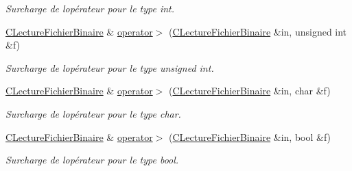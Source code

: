 \begin{DoxyCompactItemize}
\begin{DoxyCompactList}\small\item\em Surcharge de l\textquotesingle{}opérateur pour le type {\itshape int}. \end{DoxyCompactList}\item 
\hypertarget{class_c_lecture_fichier_binaire_a10555985d21e9277fd610554eb804ad4}{}\hyperlink{class_c_lecture_fichier_binaire}{C\+Lecture\+Fichier\+Binaire} \& \hyperlink{class_c_lecture_fichier_binaire_a10555985d21e9277fd610554eb804ad4}{operator$>$} (\hyperlink{class_c_lecture_fichier_binaire}{C\+Lecture\+Fichier\+Binaire} \&in, unsigned int \&f)\label{class_c_lecture_fichier_binaire_a10555985d21e9277fd610554eb804ad4}

\begin{DoxyCompactList}\small\item\em Surcharge de l\textquotesingle{}opérateur pour le type {\itshape unsigned} {\itshape int}. \end{DoxyCompactList}\item 
\hypertarget{class_c_lecture_fichier_binaire_a4a3ac4fa35e1f11664f6612d554d72bd}{}\hyperlink{class_c_lecture_fichier_binaire}{C\+Lecture\+Fichier\+Binaire} \& \hyperlink{class_c_lecture_fichier_binaire_a4a3ac4fa35e1f11664f6612d554d72bd}{operator$>$} (\hyperlink{class_c_lecture_fichier_binaire}{C\+Lecture\+Fichier\+Binaire} \&in, char \&f)\label{class_c_lecture_fichier_binaire_a4a3ac4fa35e1f11664f6612d554d72bd}

\begin{DoxyCompactList}\small\item\em Surcharge de l\textquotesingle{}opérateur pour le type {\itshape char}. \end{DoxyCompactList}\item 
\hypertarget{class_c_lecture_fichier_binaire_aaf7fbfa5e060c1e9015b0ffbd013f3e3}{}\hyperlink{class_c_lecture_fichier_binaire}{C\+Lecture\+Fichier\+Binaire} \& \hyperlink{class_c_lecture_fichier_binaire_aaf7fbfa5e060c1e9015b0ffbd013f3e3}{operator$>$} (\hyperlink{class_c_lecture_fichier_binaire}{C\+Lecture\+Fichier\+Binaire} \&in, bool \&f)\label{class_c_lecture_fichier_binaire_aaf7fbfa5e060c1e9015b0ffbd013f3e3}

\begin{DoxyCompactList}\small\item\em Surcharge de l\textquotesingle{}opérateur pour le type {\itshape bool}. \end{DoxyCompactList}\end{DoxyCompactItemize}


